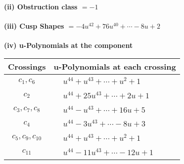 \documentclass[1p]{elsarticle_modified}
\theoremstyle{definition}
\begin{document}
\flushleft \textbf{(ii) Obstruction class $= -1$}\\~\\
\flushleft \textbf{(iii) Cusp Shapes $= -4 u^{42}+76 u^{40}+\cdots-8 u+2$}\\~\\
\newpage\renewcommand{\arraystretch}{1}
\flushleft \textbf{(iv) u-Polynomials at the component}\newline \\
\begin{tabular}{m{50pt}|m{274pt}}
Crossings & \hspace{64pt}u-Polynomials at each crossing \\
\hline $$\begin{aligned}c_{1},c_{6}\end{aligned}$$&$\begin{aligned}
&u^{44}+u^{43}+\cdots+u^2+1
\end{aligned}$\\
\hline $$\begin{aligned}c_{2}\end{aligned}$$&$\begin{aligned}
&u^{44}+25 u^{43}+\cdots+2 u+1
\end{aligned}$\\
\hline $$\begin{aligned}c_{3},c_{7},c_{8}\end{aligned}$$&$\begin{aligned}
&u^{44}- u^{43}+\cdots+16 u+5
\end{aligned}$\\
\hline $$\begin{aligned}c_{4}\end{aligned}$$&$\begin{aligned}
&u^{44}-3 u^{43}+\cdots-8 u+3
\end{aligned}$\\
\hline $$\begin{aligned}c_{5},c_{9},c_{10}\end{aligned}$$&$\begin{aligned}
&u^{44}+u^{43}+\cdots+u^2+1
\end{aligned}$\\
\hline $$\begin{aligned}c_{11}\end{aligned}$$&$\begin{aligned}
&u^{44}-11 u^{43}+\cdots-12 u+1
\end{aligned}$\\
\hline
\end{tabular}\\~\\
\end{document}
